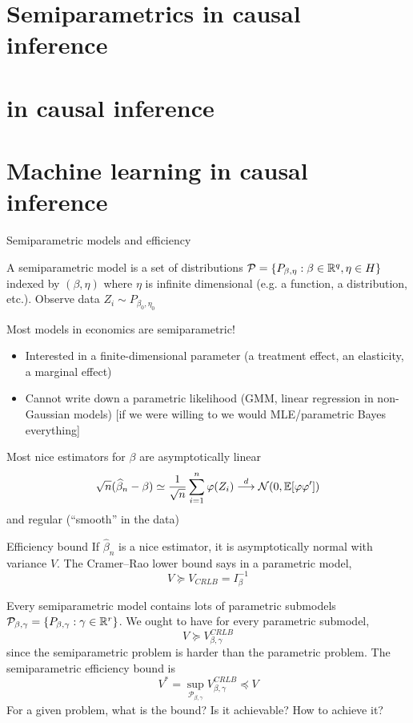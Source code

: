 \documentclass[10pt,aspectratio=169,handout]{beamer}
\theoremstyle{definition}
\begin{document}
\section{Semiparametrics in causal inference}

\section{{} in causal inference}

\section{\alert{Machine learning} in causal inference}

\begin{frame}{Semiparametric models and efficiency}

A semiparametric model is a set of distributions $\mathcal P = \{P_
{\beta,\eta} : \beta\in \mathbb{R}^q, \eta\in H\}$ indexed by $(\beta,\eta)$ where
$\eta$ is infinite dimensional (e.g. a function, a distribution, etc.).
Observe data $Z_i \sim P_{\beta_0, \eta_0}$

Most models in economics are semiparametric!
\begin{itemize}
  \item[\checkmark] Interested in a finite-dimensional parameter (a
  treatment effect, an elasticity, a marginal effect)
  \item[\checkmark] Cannot write down a parametric likelihood (GMM, linear
  regression in non-Gaussian models) [if we were willing to we would
  MLE/parametric Bayes everything]
\end{itemize}
  
Most \alert{nice} estimators for $\beta$ are \alert{asymptotically linear}
\[
\sqrt{n} (\widehat \beta_n - \beta) \simeq \frac{1}{\sqrt{n}}\sum_{i=1}^n
\varphi(Z_i) \overset{d}{\longrightarrow} \mathcal{N}(0, \mathbb{E}[\varphi \varphi'])
\]
and \alert{regular} (``smooth'' in the data)
\end{frame}

\begin{frame}{Efficiency bound}
  If $\hat \beta_n$ is a nice estimator, it is asymptotically normal with
  variance $V$. The \alert{Cramer--Rao lower bound} says in a 
  \alert{parametric}
  model, \[
  V \succeq V_{CRLB} = I_\beta^{-1}
  \]
  
  Every semiparametric model contains lots of \alert{parametric submodels}
  $\mathcal P_{\beta,\gamma} = \{P_{\beta,\gamma}: \gamma \in \mathbb{R}^r\}$. We
  ought to have for every parametric submodel, \[
  V \succeq V_{\beta,\gamma}^{CRLB}
  \]
  since the semiparametric problem is harder than the parametric problem.  The \alert{semiparametric efficiency bound} is \[
  V^* = \sup_{\mathcal P_{\beta,\gamma}} V_{\beta,\gamma}^{CRLB} \preceq V
  \]
  For a given problem, what is the bound? Is it achievable? How to achieve
  it?
\end{frame}
\end{document}
